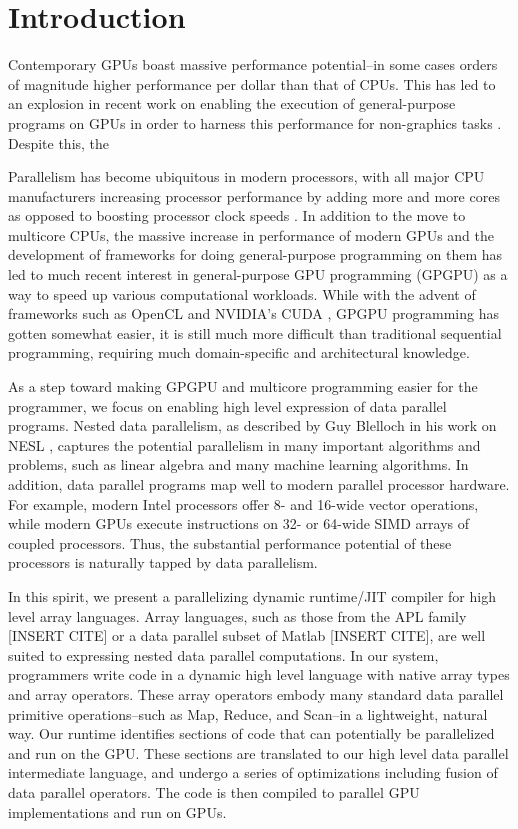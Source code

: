 \documentclass[preprint]{sigplanconf}
\begin{document}
\section{Introduction}

Contemporary GPUs boast massive performance potential--in some cases orders of
magnitude higher performance per dollar than that of CPUs.  This has led to an
explosion in recent work on enabling the execution of general-purpose programs
on GPUs in order to harness this performance for non-graphics tasks
\cite{Cata10}.  Despite this, the 

Parallelism has become ubiquitous in modern processors, with all major CPU
manufacturers increasing processor performance by adding more and more cores as
opposed to boosting processor clock speeds \cite{Asan06}.  In addition to the
move to multicore CPUs, the massive increase in performance
of modern GPUs and the development of frameworks for doing general-purpose
programming on them has led to much recent interest in general-purpose GPU
programming (GPGPU) as a way to speed up various computational workloads. While
with the advent of frameworks such as OpenCL \cite{Muns10} and NVIDIA's CUDA
\cite{NvidCU}, GPGPU programming has gotten somewhat easier, it is still much
more difficult than traditional sequential programming, requiring much
domain-specific and architectural knowledge.

As a step toward making GPGPU and multicore programming easier for the
programmer, we focus on enabling high level expression of data parallel
programs. Nested data parallelism, as described by Guy Blelloch in his work on
NESL \cite{Blel90}, captures the potential parallelism in many important
algorithms and problems, such as linear algebra and many machine learning
algorithms.  In addition, data parallel programs map well to modern
parallel processor hardware. For example, modern Intel processors offer 8- and
16-wide vector operations, while modern GPUs execute instructions on 32- or
64-wide SIMD arrays of coupled processors. Thus, the substantial
performance potential of these processors is naturally tapped by data
parallelism.

In this spirit, we present a parallelizing dynamic runtime/JIT compiler for
high level array languages.  Array languages, such as those from the APL family
[INSERT CITE] or a data parallel subset of Matlab [INSERT CITE], are well suited
to expressing nested data parallel computations. In our system, programmers
write code in a dynamic high level language with native array types and array
operators. These array operators embody many standard data parallel primitive
operations--such as Map, Reduce, and Scan--in a lightweight, natural way.  Our
runtime identifies sections of code that can potentially be parallelized and
run on the GPU.  These sections are translated to our high level data parallel
intermediate language, and undergo a series of optimizations including fusion
of data parallel operators.  The code is then compiled to parallel GPU
implementations and run on GPUs.
\end{document}
